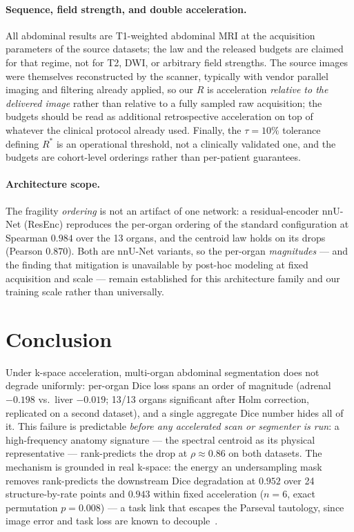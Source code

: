\documentclass[10pt,twocolumn,letterpaper]{article}
\begin{document}
\paragraph{Sequence, field strength, and double acceleration.}
All abdominal results are T1-weighted abdominal MRI at the acquisition parameters of the source
datasets; the law and the released budgets are claimed for that regime, not for T2, DWI, or arbitrary
field strengths. The source images were themselves reconstructed by the scanner, typically with
vendor parallel imaging and filtering already applied, so our $R$ is acceleration \emph{relative to
the delivered image} rather than relative to a fully sampled raw acquisition; the budgets should be
read as additional retrospective acceleration on top of whatever the clinical protocol already used.
Finally, the $\tau{=}10\%$ tolerance defining $R^{*}$ is an operational threshold, not a clinically
validated one, and the budgets are cohort-level orderings rather than per-patient guarantees.

\paragraph{Architecture scope.}
The fragility \emph{ordering} is not an artifact of one network: a residual-encoder nnU-Net (ResEnc) reproduces the per-organ ordering of the standard configuration at Spearman $0.984$ over the 13 organs, and the centroid law holds on its drops (Pearson $0.870$). Both are nnU-Net variants, so the per-organ \emph{magnitudes} --- and the finding that mitigation is unavailable by post-hoc modeling at fixed acquisition and scale --- remain established for this architecture family and our training scale rather than universally.

\section{Conclusion}
\label{sec:conclusion}

Under k-space acceleration, multi-organ abdominal segmentation does not degrade uniformly: per-organ Dice loss spans an order of magnitude (adrenal $-0.198$ vs.\ liver $-0.019$; 13/13 organs significant after Holm correction, replicated on a second dataset), and a single aggregate Dice number hides all of it. This failure is predictable \emph{before any accelerated scan or segmenter is run}: a high-frequency anatomy signature --- the spectral centroid as its physical representative --- rank-predicts the drop at $\rho \approx 0.86$ on both datasets. The mechanism is grounded in real k-space: the energy an undersampling mask removes rank-predicts the downstream Dice degradation at $0.952$ over 24 structure-by-rate points and $0.943$ within fixed acceleration ($n{=}6$, exact permutation $p{=}0.008$) --- a task link that escapes the Parseval tautology, since image error and task loss are known to decouple~\cite{tolpadi2023,morshuis2025}.
\end{document}
